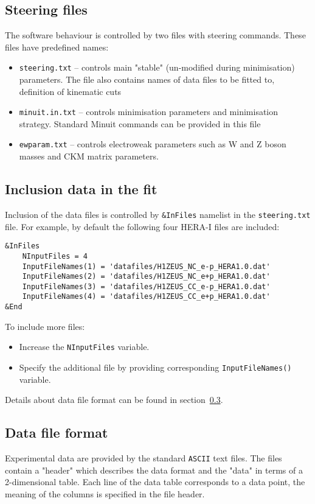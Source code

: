 \documentclass[11pt,a4paper]{article}
\begin{document}
\subsection{Steering files}
    The software behaviour is controlled by two files with steering commands.
    These files have predefined names:
    \begin{itemize}
      \item {\tt steering.txt}  --   controls main "stable" (un-modified during 
                         minimisation) parameters. The file also contains
                         names of data files to be fitted to, definition 
                         of kinematic cuts                              
      \item {\tt minuit.in.txt}
                   --  controls minimisation parameters and minimisation 
                         strategy. Standard Minuit commands can be provided
                         in this file
      \item {\tt ewparam.txt}    --  controls electroweak parameters such
         as W and Z boson masses and CKM matrix parameters.
    \end{itemize}
\subsection{Inclusion data in the fit}
Inclusion of the data files is controlled by {\tt \&InFiles} namelist in the 
{\tt steering.txt} file. For example, by default the following four HERA-I
    files are included:
\begin{verbatim}
&InFiles
    NInputFiles = 4
    InputFileNames(1) = 'datafiles/H1ZEUS_NC_e-p_HERA1.0.dat'
    InputFileNames(2) = 'datafiles/H1ZEUS_NC_e+p_HERA1.0.dat'
    InputFileNames(3) = 'datafiles/H1ZEUS_CC_e-p_HERA1.0.dat'
    InputFileNames(4) = 'datafiles/H1ZEUS_CC_e+p_HERA1.0.dat'
&End
\end{verbatim}

To include more files:
\begin{itemize}
 \item  Increase the {\tt NInputFiles} variable.
 \item  Specify the additional file by providing corresponding
  {\tt InputFileNames()} variable.
\end{itemize}
Details about data file format can be found in section~\ref{sec:dataformat}.
\subsection{Data file format}
\label{sec:dataformat}
   Experimental data are provided by the standard {\tt ASCII} text files. The files
   contain a "header" which describes the data format and the "data" in terms
   of a 2-dimensional table. Each line of the data table corresponds to a
   data point, the meaning of the columns is specified in the file header.
\end{document}
